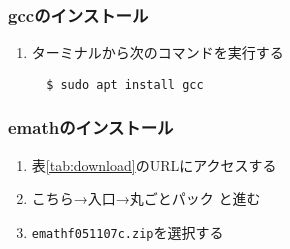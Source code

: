 \subsubsection{gccのインストール}
\begin{enumerate}
    \item ターミナルから次のコマンドを実行する
    \begin{lstlisting}
  $ sudo apt install gcc
    \end{lstlisting}
\end{enumerate}

\subsubsection{emathのインストール}
\begin{enumerate}
    \item 表\ref{tab:download}のURLにアクセスする
    \item こちら→入口→丸ごとパック と進む
    \item \verb|emathf051107c.zip|を選択する
\end{enumerate}

